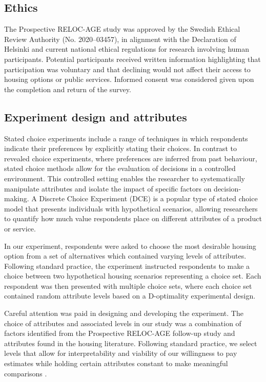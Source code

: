 \documentclass[3p,11pt ]{elsarticle}
\begin{document}
\subsection{Ethics}

The Prospective RELOC-AGE study was approved by the Swedish Ethical Review Authority (No. 2020–03457), in alignment with the Declaration of Helsinki and current national ethical regulations for research involving human participants.
Potential participants received written information highlighting that participation was voluntary and that declining would not affect their access to housing options or public services.
Informed consent was considered given upon the completion and return of the survey.



\subsection{Experiment design and attributes}

Stated choice experiments include a range of techniques in which respondents indicate their preferences by explicitly stating their choices.
In contrast to revealed choice experiments, where preferences are inferred from past behaviour, stated choice methods allow for the evaluation of decisions in a controlled environment.
This controlled setting enables the researcher to systematically manipulate attributes and isolate the impact of specific factors on decision-making.
A Discrete Choice Experiment (DCE) is a popular type of stated choice model that presents individuals with hypothetical scenarios, allowing researchers to quantify how much value respondents place on different attributes of a product or service.

In our experiment,
respondents were asked to choose the most desirable housing option from a set of alternatives which contained varying levels of attributes.
Following standard practice,
the experiment instructed respondents to make a choice between two hypothetical housing scenarios representing a choice set.
Each respondent was then presented with multiple choice sets,
where each choice set contained random attribute levels based on a D-optimality experimental design.

Careful attention was paid in designing and developing the experiment.
The choice of attributes and associated levels in our study was a combination of factors identified from the Prospective RELOC-AGE follow-up study and attributes found in the housing literature.
Following standard practice,
we select levels that allow for interpretability and viability of our willingness to pay estimates while holding certain attributes constant to make meaningful comparisons \citep{hensherAppliedChoiceAnalysis2015}.
\end{document}
